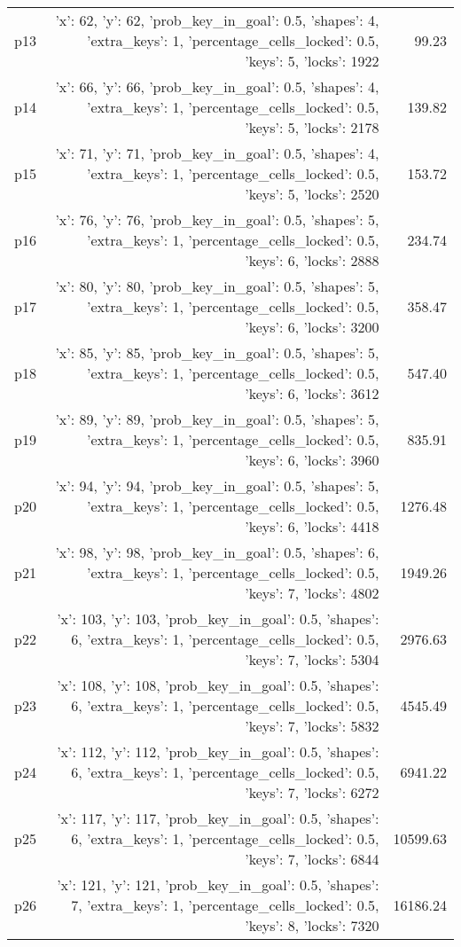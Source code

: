 \documentclass{article}
\begin{document}
\begin{center}
\begin{tabular}{@{}l|r|r@{}}
  p13&{'x': 62, 'y': 62, 'prob\_key\_in\_goal': 0.5, 'shapes': 4, 'extra\_keys': 1, 'percentage\_cells\_locked': 0.5, 'keys': 5, 'locks': 1922}&99.23\\
  p14&{'x': 66, 'y': 66, 'prob\_key\_in\_goal': 0.5, 'shapes': 4, 'extra\_keys': 1, 'percentage\_cells\_locked': 0.5, 'keys': 5, 'locks': 2178}&139.82\\
  p15&{'x': 71, 'y': 71, 'prob\_key\_in\_goal': 0.5, 'shapes': 4, 'extra\_keys': 1, 'percentage\_cells\_locked': 0.5, 'keys': 5, 'locks': 2520}&153.72\\
  p16&{'x': 76, 'y': 76, 'prob\_key\_in\_goal': 0.5, 'shapes': 5, 'extra\_keys': 1, 'percentage\_cells\_locked': 0.5, 'keys': 6, 'locks': 2888}&234.74\\
  p17&{'x': 80, 'y': 80, 'prob\_key\_in\_goal': 0.5, 'shapes': 5, 'extra\_keys': 1, 'percentage\_cells\_locked': 0.5, 'keys': 6, 'locks': 3200}&358.47\\
  p18&{'x': 85, 'y': 85, 'prob\_key\_in\_goal': 0.5, 'shapes': 5, 'extra\_keys': 1, 'percentage\_cells\_locked': 0.5, 'keys': 6, 'locks': 3612}&547.40\\
  p19&{'x': 89, 'y': 89, 'prob\_key\_in\_goal': 0.5, 'shapes': 5, 'extra\_keys': 1, 'percentage\_cells\_locked': 0.5, 'keys': 6, 'locks': 3960}&835.91\\
  p20&{'x': 94, 'y': 94, 'prob\_key\_in\_goal': 0.5, 'shapes': 5, 'extra\_keys': 1, 'percentage\_cells\_locked': 0.5, 'keys': 6, 'locks': 4418}&1276.48\\
  p21&{'x': 98, 'y': 98, 'prob\_key\_in\_goal': 0.5, 'shapes': 6, 'extra\_keys': 1, 'percentage\_cells\_locked': 0.5, 'keys': 7, 'locks': 4802}&1949.26\\
  p22&{'x': 103, 'y': 103, 'prob\_key\_in\_goal': 0.5, 'shapes': 6, 'extra\_keys': 1, 'percentage\_cells\_locked': 0.5, 'keys': 7, 'locks': 5304}&2976.63\\
  p23&{'x': 108, 'y': 108, 'prob\_key\_in\_goal': 0.5, 'shapes': 6, 'extra\_keys': 1, 'percentage\_cells\_locked': 0.5, 'keys': 7, 'locks': 5832}&4545.49\\
  p24&{'x': 112, 'y': 112, 'prob\_key\_in\_goal': 0.5, 'shapes': 6, 'extra\_keys': 1, 'percentage\_cells\_locked': 0.5, 'keys': 7, 'locks': 6272}&6941.22\\
  p25&{'x': 117, 'y': 117, 'prob\_key\_in\_goal': 0.5, 'shapes': 6, 'extra\_keys': 1, 'percentage\_cells\_locked': 0.5, 'keys': 7, 'locks': 6844}&10599.63\\
  p26&{'x': 121, 'y': 121, 'prob\_key\_in\_goal': 0.5, 'shapes': 7, 'extra\_keys': 1, 'percentage\_cells\_locked': 0.5, 'keys': 8, 'locks': 7320}&16186.24\\

\end{tabular}
\end{center}
\end{document}
